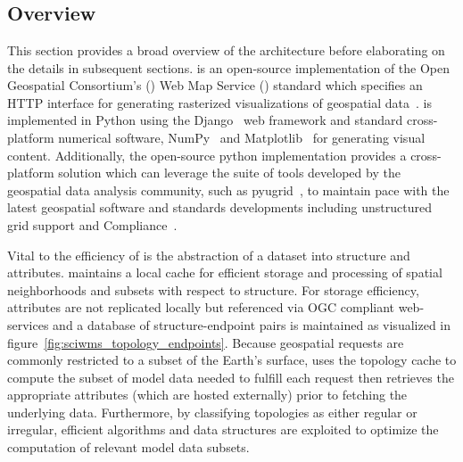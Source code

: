 \section{\sciwms{}}
\label{sec:sciwms}

\subsection{Overview}
This section provides a broad overview of the \sciwms{} architecture
before elaborating on the details in subsequent sections. \Sciwms{} is
an open-source implementation of the Open Geospatial Consortium's
(\ogc{}) Web Map Service (\wms{}) standard which specifies an HTTP
interface for generating rasterized visualizations of geospatial
data~\cite{wms14}. \sciwms{} is implemented in Python using the
Django~\cite{django} web framework and standard cross-platform
numerical software, NumPy~\cite{numpy11} and
Matplotlib~\cite{hunter07} for generating visual
content. Additionally, the open-source python implementation provides
a cross-platform \wms{} solution which can leverage the suite of tools
developed by the geospatial data analysis community, such as
pyugrid~\cite{pyugrid}, to maintain pace with the latest geospatial
software and standards developments including unstructured grid
support and \cfugrid{} Compliance~\cite{cfugrid}.

Vital to the efficiency of \sciwms{} is the abstraction of a dataset
into structure and attributes. \Sciwms{} maintains a local cache for
efficient storage and processing of spatial neighborhoods and subsets
with respect to structure. For storage efficiency, attributes are not
replicated locally but referenced via OGC compliant web-services and a
database of structure-endpoint pairs is maintained as visualized in
figure~\ref{fig:sciwms_topology_endpoints}. Because geospatial \wms{}
requests are commonly restricted to a subset of the Earth's surface,
\sciwms{} uses the topology cache to compute the subset of model data
needed to fulfill each request then retrieves the appropriate
attributes (which are hosted externally) prior to fetching the
underlying data. Furthermore, by classifying topologies as either
regular or irregular, efficient algorithms and data structures are
exploited to optimize the computation of relevant model data subsets.

